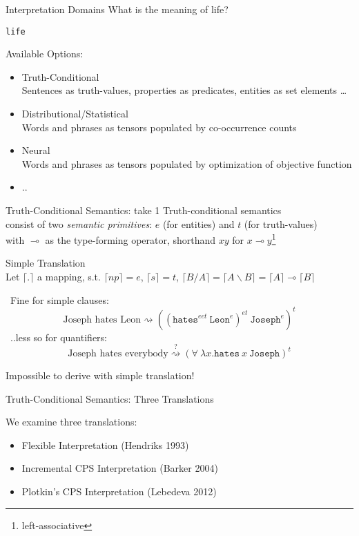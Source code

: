 \documentclass{beamer}
\newcommand{\term}[1]{\texttt{#1}}
\newcommand{\li}{\!\multimap\!}
\newcommand{\trans}[1]{\lceil #1 \rceil}
\begin{document}
\begin{frame}{Interpretation Domains}
	\small
	What is the meaning of life?
	\pause
	\begin{flushright}
		\texttt{life}
	\end{flushright}

	\pause
	Available Options:
	\begin{itemize}
		\item Truth-Conditional \\
		{\footnotesize Sentences as truth-values, properties as predicates, entities as set elements \dots}
		\item Distributional/Statistical \\
		{\footnotesize Words and phrases as tensors populated by co-occurrence counts}
		\item Neural \\
		{\footnotesize Words and phrases as tensors populated by optimization of objective function}
		\item ..
	\end{itemize}
\end{frame}

\begin{frame}{Truth-Conditional Semantics: take 1}
	\small
	\alert{Truth-conditional semantics}\\
	consist of two \textit{semantic primitives}: $e$ (for entities) and $t$ (for truth-values)\\
	with $\li$ as the type-forming operator, shorthand $xy$ for $x\li y$\footnote{left-associative}
	\vfill	
	
	\pause
	\alert{Simple Translation}\\
	Let $\trans{.}$ a mapping, s.t. $\trans{np} = e$, $\trans{s} = t$, $\trans{B/A} = \trans{A\backslash B} = \trans{A} \li \trans{B}$
	\vfill
	
	\pause
	\smiley \ Fine for simple clauses:
	\[
		\text{Joseph hates Leon} \rightsquigarrow ((\term{hates}^{eet} \ \term{Leon}^{e})^{et} \ \term{Joseph}^e)^t
	\]
	\pause
	\frownie \ ..less so for quantifiers:
	\[
		\text{Joseph hates everybody} \stackrel{?}{\rightsquigarrow} (\forall \ \lambda x.\term{hates} \ x  \ \term{Joseph})^t
	\]
	\begin{flushright}
		Impossible to derive with simple translation!
	\end{flushright}
	
\end{frame}

\begin{frame}{Truth-Conditional Semantics: Three Translations}
	
	We examine three translations:
	\begin{itemize}
	\item Flexible Interpretation (Hendriks 1993)
	\item Incremental CPS Interpretation (Barker 2004)
	\item Plotkin's CPS Interpretation (Lebedeva 2012)
	\end{itemize}
\end{frame}
\end{document}
